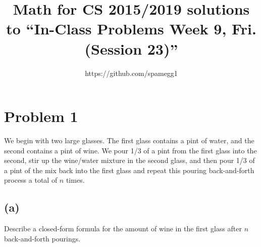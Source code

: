 \documentclass[14pt]{extarticle}
\title{Math for CS 2015/2019 solutions to ``In-Class Problems Week 9, Fri. (Session 23)''}
\author{https://github.com/spamegg1}
\begin{document}
\maketitle
\tableofcontents

\section{Problem 1}
We begin with two large glasses. The first glass contains a pint of water, and the second contains a pint of wine. We pour 1/3 of a pint from the first glass into the second, stir up the wine/water mixture in the second glass, and then pour 1/3 of a pint of the mix back into the first glass and repeat this pouring back-and-forth
process a total of $n$ times.

\subsection{(a)}
Describe a closed-form formula for the amount of wine in the first glass after $n$ back-and-forth pourings.
\end{document}
